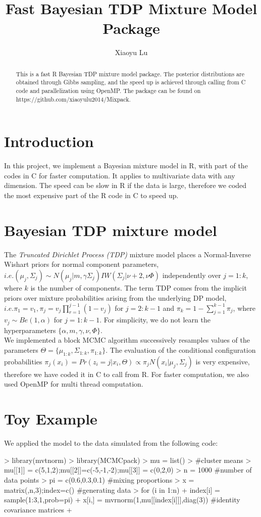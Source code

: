 \documentclass[a4paper]{article}
\title{Fast Bayesian TDP Mixture Model Package}
\author{Xiaoyu Lu}
\begin{document}

\maketitle
\begin{abstract}
This is a fast R Bayesian TDP mixture model package. The posterior distributions are obtained through Gibbs sampling, and the speed up is achieved through calling from C code and parallelization using OpenMP. The package can be found on https://github.com/xiaoyulu2014/Mixpack.
\end{abstract}
\section{Introduction}
In this project, we implement a Bayesian mixture model in R, with part of the codes in C for faster computation. It applies to multivariate data with any dimension. The speed can be slow in R if the data is large, therefore we coded the most expensive part of the R code in C to speed up. 


\section{Bayesian TDP mixture model}
The \emph{Truncated Dirichlet Process (TDP)} mixture model places a Normal-Inverse Wishart priors for normal component parameters, $i.e. (\mu_j, \Sigma_j) \sim  N(\mu_j|m,\gamma\Sigma_j)IW(\Sigma_j|\nu+2,\nu\Phi)$ independently over $j=1:k$, where $k$ is the number of components. The term TDP comes from the implicit priors over mixture probabilities arising from the underlying DP model, $i.e. \pi_1 = v_1, \pi_j = v_j\prod_{r=1}^{j-1}(1-v_j)$ for $j=2:k-1$ and $\pi_k = 1 - \sum_{j=1}^{k-1}\pi_j$, where $v_j \sim Be(1,\alpha)$ for $j=1:k-1$. For simplicity, we do not learn the hyperparameters $\{\alpha,m,\gamma,\nu,\Phi\}$. \\

We implemented a block MCMC algorithm successively resamples values of the parameters $\Theta = \{\mu_{1:k},\Sigma_{1:k},\pi_{1:k}\}$. The evaluation of the conditional configuration probabilities $\pi_j(x_i) = Pr(z_i=j|x_i,\Theta) \propto \pi_jN(x_i|\mu_j,\Sigma_j)$ is very expensive, therefore we have coded it in C to call from R. For faster computation, we also used OpenMP for multi thread computation.


\section{Toy Example}
We applied the model to the data simulated from the following code:
\begin{Schunk}
\begin{Sinput}
> library(mvtnorm)
> library(MCMCpack)
> mu = list()
> #cluster means
> mu[[1]] = c(5,1,2);mu[[2]]=c(-5,-1,-2);mu[[3]] = c(0,2,0)
> n = 1000    #number of data points
> pi = c(0.6,0.3,0.1)   #mixing proportions
> x = matrix(,n,3);index=c()    #generating data
> for (i in 1:n){
+   index[i] = sample(1:3,1,prob=pi)
+   x[i,] = mvrnorm(1,mu[[index[i]]],diag(3))  #identity covariance matrices
+ }
\end{Sinput}
\end{Schunk}
\end{document}
